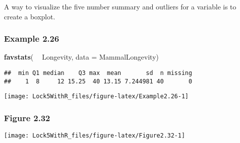 \documentclass[]{book}
\newenvironment{Shaded}{\begin{snugshade}}{\end{snugshade}}
\newcommand{\DataTypeTok}[1]{\textcolor[rgb]{0.13,0.29,0.53}{#1}}
\newcommand{\KeywordTok}[1]{\textcolor[rgb]{0.13,0.29,0.53}{\textbf{#1}}}
\newcommand{\NormalTok}[1]{#1}
\newcommand{\OperatorTok}[1]{\textcolor[rgb]{0.81,0.36,0.00}{\textbf{#1}}}
\newcommand{\StringTok}[1]{\textcolor[rgb]{0.31,0.60,0.02}{#1}}
\begin{document}
A way to visualize the five number summary and outliers for a variable is to create a boxplot.

\hypertarget{example-2.26}{%
\subsubsection{Example 2.26}\label{example-2.26}}

\begin{Shaded}
\begin{Highlighting}[]
\KeywordTok{favstats}\NormalTok{( }\OperatorTok{~}\StringTok{ }\NormalTok{Longevity, }\DataTypeTok{data =}\NormalTok{ MammalLongevity)}
\end{Highlighting}
\end{Shaded}

\begin{verbatim}
##  min Q1 median    Q3 max  mean       sd  n missing
##    1  8     12 15.25  40 13.15 7.244981 40       0
\end{verbatim}

\begin{Shaded}
\end{Shaded}

\texttt{[image: Lock5WithR\_files/figure-latex/Example2.26-1]}

\hypertarget{figure-2.32}{%
\subsubsection{Figure 2.32}\label{figure-2.32}}

\begin{Shaded}
\end{Shaded}

\texttt{[image: Lock5WithR\_files/figure-latex/Figure2.32-1]}
\end{document}
